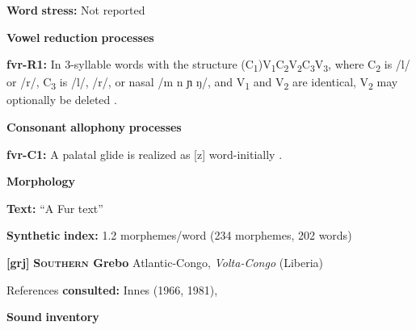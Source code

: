 \documentclass[output=paper]{langsci/langscibook}
\begin{document}
\begin{styleBody}
\textbf{Word} \textbf{stress:} Not reported
\end{styleBody}

\begin{styleBody}
\textbf{Vowel} \textbf{reduction} \textbf{processes}
\end{styleBody}

\begin{styleBody}
\textbf{fvr-R1:} In 3-syllable words with the structure (C\textsubscript{1})V\textsubscript{1}C\textsubscript{2}V\textsubscript{2}C\textsubscript{3}V\textsubscript{3}, where C\textsubscript{2} is /l/ or /r/, C\textsubscript{3} is /l/, /r/, or nasal /m n ɲ ŋ/, and V\textsubscript{1} and V\textsubscript{2} are identical, V\textsubscript{2} may optionally be deleted \citep[60-61]{Jakobi1990}.
\end{styleBody}

\begin{styleBody}
\textbf{Consonant} \textbf{allophony} \textbf{processes}
\end{styleBody}

\begin{styleBody}
\textbf{fvr-C1:} A palatal glide is realized as [z] word-initially \citep[19]{Jakobi1990}.
\end{styleBody}

\begin{styleBody}
\textbf{Morphology}
\end{styleBody}

\begin{styleBody}
\textbf{Text:} “A Fur text” \citep[125-127]{Jakobi1990}
\end{styleBody}

\begin{styleBody}
\textbf{Synthetic} \textbf{index:} 1.2 morphemes/word (234 morphemes, 202 words)
\end{styleBody}

\begin{styleBody}
\textbf{[grj]}   \textbf{\textsc{Southern} \textbf{Grebo}}  Atlantic-Congo, \textit{Volta-Congo} (Liberia)
\end{styleBody}

\begin{styleBody}
References \textbf{consulted:} Innes (1966, 1981), \citet{Newman1986}
\end{styleBody}

\begin{styleBody}
\textbf{Sound} \textbf{inventory}
\end{styleBody}
\end{document}
